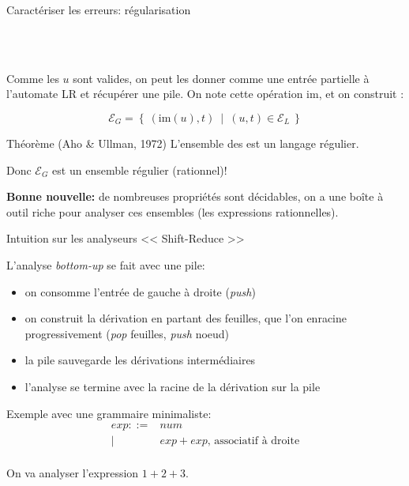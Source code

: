 \documentclass{beamer}          %
\begin{document}
\begin{frame}[t]{Caractériser les erreurs: régularisation}

 \  \\
 \

  Comme les $u$ sont valides, on peut les donner comme une entrée partielle à l'automate LR et récupérer une pile. On note cette opération $\text{im}$, et on construit :

  $$
  \mathcal E_G = \left\{\ (\text{im}(u), t)\ \mid\ (u, t) \in \mathcal E_L\ \right\}
  $$

  \pause
  \begin{block}{Théorème (Aho \& Ullman, 1972)}
  L'ensemble des  est un langage régulier.  \\
  \end{block}

  \pause
  \pause

  Donc $\mathcal E_G$ est un ensemble régulier (rationnel)!

  \textbf{Bonne nouvelle:} de nombreuses propriétés sont décidables, on
  a une boîte à outil riche pour analyser ces ensembles (les expressions
  rationnelles).

\end{frame}

\begin{frame}{Intuition sur les analyseurs << Shift-Reduce >>}

  L'analyse {\em bottom-up} se fait avec une pile:
  \begin{itemize}
    \item on consomme l'entrée de gauche à droite ({\em push})
    \item on construit la dérivation en partant des feuilles,
          que l'on enracine progressivement ({\em pop} feuilles, {\em push} noeud)
    \item la pile sauvegarde les dérivations intermédiaires
    \item l'analyse se termine avec la racine de la dérivation sur la pile
  \end{itemize}

  \pause

  Exemple avec une grammaire minimaliste:
  $$
  \begin{array}{rl}
    exp ::= & num \\
          | & exp + exp \text{, associatif à droite}\\
  \end{array}
  $$

  On va analyser l'expression $1+2+3$.
\end{frame}
\end{document}
